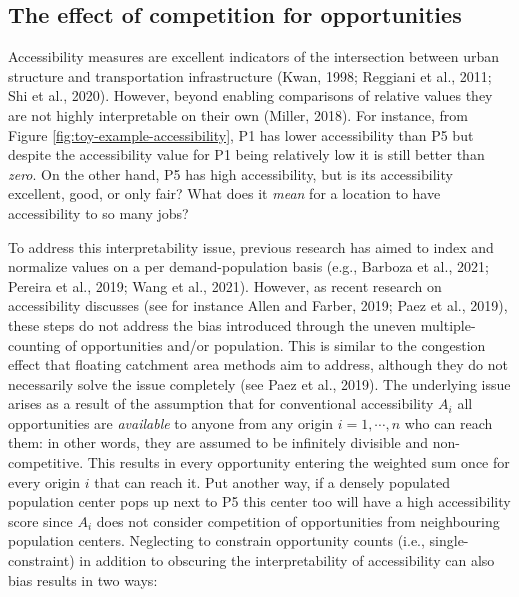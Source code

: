\documentclass[]{elsarticle} %
\begin{document}
\hypertarget{the-effect-of-competition-for-opportunities}{%
\subsection{The effect of competition for
opportunities}\label{the-effect-of-competition-for-opportunities}}

Accessibility measures are excellent indicators of the intersection
between urban structure and transportation infrastructure (Kwan, 1998;
Reggiani et al., 2011; Shi et al., 2020). However, beyond enabling
comparisons of relative values they are not highly interpretable on
their own (Miller, 2018). For instance, from Figure
\ref{fig:toy-example-accessibility}, P1 has lower accessibility than P5
but despite the accessibility value for P1 being relatively low it is
still better than \emph{zero}. On the other hand, P5 has high
accessibility, but is its accessibility excellent, good, or only fair?
What does it \emph{mean} for a location to have accessibility to so many
jobs?

To address this interpretability issue, previous research has aimed to
index and normalize values on a per demand-population basis (e.g.,
Barboza et al., 2021; Pereira et al., 2019; Wang et al., 2021). However,
as recent research on accessibility discusses (see for instance Allen
and Farber, 2019; Paez et al., 2019), these steps do not address the
bias introduced through the uneven multiple-counting of opportunities
and/or population. This is similar to the congestion effect that
floating catchment area methods aim to address, although they do not
necessarily solve the issue completely (see Paez et al., 2019). The
underlying issue arises as a result of the assumption that for
conventional accessibility \(A_i\) all opportunities are
\emph{available} to anyone from any origin \(i=1,\cdots,n\) who can
reach them: in other words, they are assumed to be infinitely divisible
and non-competitive. This results in every opportunity entering the
weighted sum once for every origin \(i\) that can reach it. Put another
way, if a densely populated population center pops up next to P5 this
center too will have a high accessibility score since \(A_i\) does not
consider competition of opportunities from neighbouring population
centers. Neglecting to constrain opportunity counts (i.e.,
single-constraint) in addition to obscuring the interpretability of
accessibility can also bias results in two ways:
\end{document}
